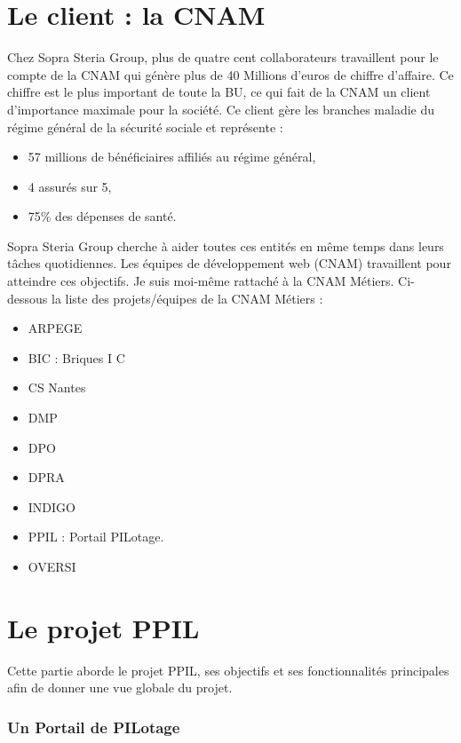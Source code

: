 \section{Le client : la CNAM}

Chez Sopra Steria Group, plus de quatre cent collaborateurs travaillent pour le compte de la CNAM qui génère plus de 40 Millions d’euros de chiffre d’affaire. Ce chiffre est le plus important de toute la BU, ce qui fait de la CNAM un client d’importance maximale pour la société. Ce client gère les branches maladie du régime général de la sécurité sociale et représente :

\begin{itemize}
    \item 57 millions de bénéficiaires affiliés au régime général, 
    \item 4 assurés sur 5, 
    \item 75\% des dépenses de santé. 
\end{itemize}

Sopra Steria Group cherche à aider toutes ces entités en même temps dans leurs tâches quotidiennes. Les équipes de développement web (CNAM) travaillent pour atteindre ces objectifs. Je suis moi-même rattaché à la CNAM Métiers. Ci-dessous la liste des projets/équipes de la CNAM Métiers :

\begin{itemize}
    \item ARPEGE
    \item BIC : Briques I C
    \item CS Nantes
    \item DMP
    \item DPO
    \item DPRA
    \item INDIGO
    \item PPIL : Portail PILotage.
    \item OVERSI
\end{itemize}

\section{Le projet PPIL}

Cette partie aborde le projet PPIL, ses objectifs et ses fonctionnalités principales afin de donner une vue globale du projet.

\subsubsection{Un Portail de PILotage}


